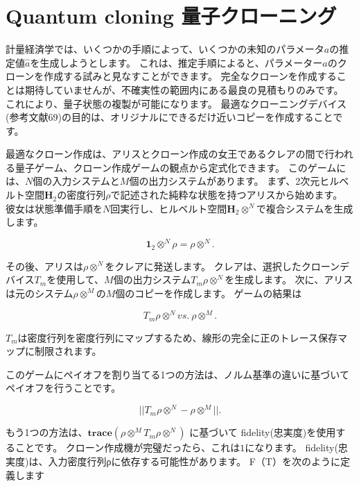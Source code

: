 \section{Quantum cloning 量子クローニング}

計量経済学では、いくつかの手順によって、いくつかの未知のパラメータ$a$の推定値$\hat{a}$を生成しようとします。
これは、推定手順によると、パラメーター$a$のクローンを作成する試みと見なすことができます。
完全なクローンを作成することは期待していませんが、不確実性の範囲内にある最良の見積もりのみです。
これにより、量子状態の複製が可能になります。
最適なクローニングデバイス(参考文献69)の目的は、オリジナルにできるだけ近いコピーを作成することです。

最適なクローン作成は、アリスとクローン作成の女王であるクレアの間で行われる量子ゲーム、クローン作成ゲームの観点から定式化できます。
このゲームには、$N$個の入力システムと$M$個の出力システムがあります。 まず、2次元ヒルベルト空間$\mathbf{H}_2$の密度行列$\rho$で記述された純粋な状態を持つアリスから始めます。
彼女は状態準備手順を$N$回実行し、ヒルベルト空間$\mathbf{H}_2 \otimes ^N$で複合システムを生成します。

\begin{equation}
\label{260}
\mathbf{1}_2 \otimes ^N \rho =  \rho \otimes ^N  .
\end{equation}

その後、アリスは$ \rho \otimes ^N$をクレアに発送します。 クレアは、選択したクローンデバイス$T_m $を使用して、$M$個の出力システム$T_m \rho \otimes ^N $を生成します。
次に、アリスは元のシステム$ \rho \otimes ^M $の$M$個のコピーを作成します。 ゲームの結果は

\begin{equation}
\label{261}
T_m \rho \otimes ^N  vs. \   \rho \otimes ^M  .
\end{equation}

$T_m$は密度行列を密度行列にマップするため、線形の完全に正のトレース保存マップに制限されます。

このゲームにペイオフを割り当てる1つの方法は、ノルム基準の違いに基づいてペイオフを行うことです。

\begin{equation}
\label{262}
|| T_m \rho \otimes ^N  -  \rho \otimes ^M  ||.
\end{equation}

もう1つの方法は、$\mathbf{trace}( \rho \otimes ^M  T_m \rho \otimes ^N)$ に基づいて fidelity(忠実度)を使用することです。
クローン作成機が完璧だったら、これは$1$になります。
 fidelity(忠実度)は、入力密度行列ρに依存する可能性があります。
F（T）を次のように定義します

